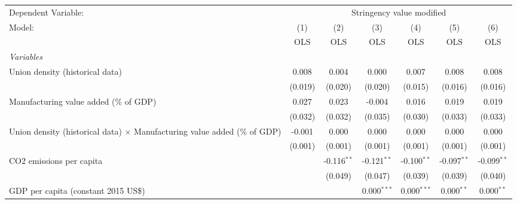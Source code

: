 
\begingroup
\centering
\begin{tabular}{lcccccc}
   \toprule
   Dependent Variable: & \multicolumn{6}{c}{Stringency value modified}\\
   Model:                                                                           & (1)     & (2)           & (3)           & (4)           & (5)           & (6)\\  
                                                                                    &  OLS    & OLS           & OLS           & OLS           & OLS           & OLS\\  
   \midrule
   \emph{Variables}\\
   Union density (historical data)                                                  & 0.008   & 0.004         & 0.000         & 0.007         & 0.008         & 0.008\\   
                                                                                    & (0.019) & (0.020)       & (0.020)       & (0.015)       & (0.016)       & (0.016)\\   
   Manufacturing value added (\% of GDP)                                            & 0.027   & 0.023         & -0.004        & 0.016         & 0.019         & 0.019\\   
                                                                                    & (0.032) & (0.032)       & (0.035)       & (0.030)       & (0.033)       & (0.033)\\   
   Union density (historical data) $\times$ Manufacturing value added (\% of GDP)   & -0.001  & 0.000         & 0.000         & 0.000         & 0.000         & 0.000\\   
                                                                                    & (0.001) & (0.001)       & (0.001)       & (0.001)       & (0.001)       & (0.001)\\   
   CO2 emissions per capita                                                         &         & -0.116$^{**}$ & -0.121$^{**}$ & -0.100$^{**}$ & -0.097$^{**}$ & -0.099$^{**}$\\   
                                                                                    &         & (0.049)       & (0.047)       & (0.039)       & (0.039)       & (0.040)\\   
   GDP per capita (constant 2015 US\$)                                              &         &               & 0.000$^{***}$ & 0.000$^{***}$ & 0.000$^{**}$  & 0.000$^{**}$\\   

\end{tabular}
